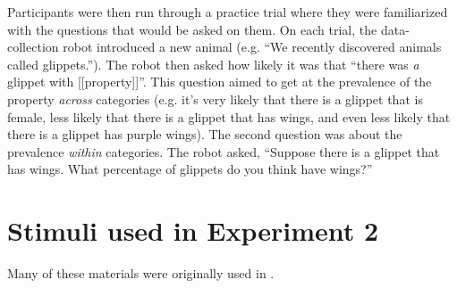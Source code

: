 \documentclass[10pt,letterpaper]{article}
\begin{document}
Participants were then run through a practice trial where they were familiarized with the questions that would be asked on them. 
On each trial, the data-collection robot introduced a new animal (e.g. ``We recently discovered animals called glippets.''). 
The robot then asked how likely it was that ``there was \emph{a} glippet with [[property]]''. 
This question aimed to get at the prevalence of the property \emph{across} categories (e.g. it's very likely that there is a glippet that is female, less likely that there is a glippet that has wings, and even less likely that there is a glippet has purple wings). 
The second question was about the prevalence \emph{within} categories. The robot asked, ``Suppose there is a glippet that has wings. What percentage of glippets do you think have wings?''

\section{Stimuli used in Experiment 2}
\label{sec:materials2}

Many of these materials were originally used in .
\end{document}
